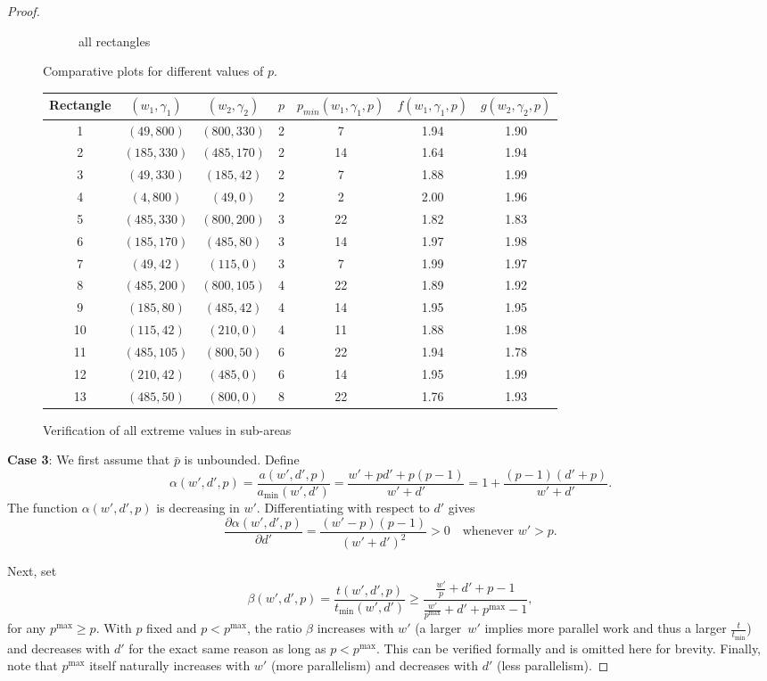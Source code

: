 \documentclass{article}
\begin{document}
\begin{proof}
\begin{figure}[ht]
\begin{subfigure}{0.32\textwidth}
        \caption{all rectangles}
    \end{subfigure}
    \caption{Comparative plots for different values of $p$.}
    \label{fig:all_plotsgen}
\end{figure}

\begin{figure}
\center
\begin{tabular}{|c|c|c|c|c|c|c|}
\hline
Rectangle & $(w_1,\gamma_1)$ & $(w_2,\gamma_2)$ & $p$ & $p_{min}(w_1,\gamma_1,p) $& $f(w_1,\gamma_1,p)$ & $g(w_2,\gamma_2,p)$ \\
\hline
1 & $(49,800)$ & $(800,330)$ & 2 &7 & 1.94 & 1.90 \\
2 & $(185,330)$ & $(485,170)$ & 2 &14 & 1.64 & 1.94 \\
3 & $(49,330)$ & $(185,42)$ & 2 &7 & 1.88 & 1.99 \\
4 & $(4,800)$ & $(49,0)$ & 2 &2 & 2.00 & 1.96 \\
5 & $(485,330)$ & $(800,200)$ & 3 &22 & 1.82 & 1.83 \\
6 & $(185,170)$ & $(485,80)$ & 3 &14 & 1.97 & 1.98 \\
7 & $(49,42)$ & $(115,0)$ & 3 &7 & 1.99 & 1.97 \\
8 & $(485,200)$ & $(800,105)$ & 4 &22 & 1.89 & 1.92 \\
9 & $(185,80)$ & $(485,42)$ & 4 &14 & 1.95 & 1.95 \\
10 & $(115,42)$ & $(210,0)$ & 4 &11 & 1.88 & 1.98 \\
11 & $(485,105)$ & $(800,50)$ & 6 &22 & 1.94 & 1.78 \\
12 & $(210,42)$ & $(485,0)$ & 6 &14 & 1.95 & 1.99 \\
13 & $(485,50)$ & $(800,0)$ & 8 &22 & 1.76 & 1.93 \\
\hline
\end{tabular}
\caption{Verification of all extreme values in sub-areas}
\label{fig.verif2}
\end{figure}
\textbf{Case 3}: We first assume that $\bar{p}$ is unbounded.  
Define
\[
\alpha(w',d',p)=\frac{a(w',d',p)}{a_{\min}(w',d')}
               =\frac{w'+pd'+p(p-1)}{w'+d'}
               =1+\frac{(p-1)(d'+p)}{w'+d'} .
\]
The function $\alpha(w',d',p)$ is decreasing in $w'$.  
Differentiating with respect to $d'$ gives
\[
\frac{\partial\alpha(w',d',p)}{\partial d'}
   =\frac{(w'-p)(p-1)}{(w'+d')^{2}}>0
   \quad\text{whenever } w'>p .
\]

Next, set
\[
\beta(w',d',p)=\frac{t(w',d',p)}{t_{\min}(w',d')}
             \ge\frac{\tfrac{w'}{p}+d'+p-1}{
                     \tfrac{w'}{p^{\max}}+d'+p^{\max}-1},
\]
for any $p^{\max}\ge p$.  
With $p$ fixed and $p<p^{\max}$, the ratio \(\beta\) increases with $w'$ (a
larger~$w'$ implies more parallel work and thus a larger
$\tfrac{t}{t_{\min}}$) and decreases with $d'$ for the exact same reason as long as $p<p^{\max}$.  
This can be verified formally and is omitted here for brevity.  
Finally, note that $p^{\max}$ itself naturally increases with $w'$ (more parallelism) and decreases with
$d'$ (less parallelism).


\end{proof}
\end{document}
